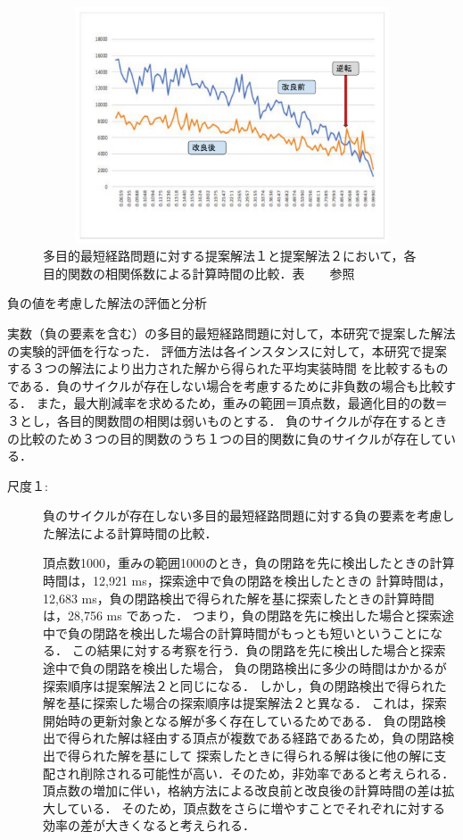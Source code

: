 \documentclass[12pt]{optlab-bachelor}
\begin{document}
\begin{figure}[htbp]
  \centering
  \includegraphics[height=7.0cm , width=15.0cm]{fig/fig18.pdf}
  \caption{多目的最短経路問題に対する提案解法１と提案解法２において，各目的関数の相関係数による計算時間の比較．表　　参照}
\end{figure}


\begin{description}
  \item[負の値を考慮した解法の評価と分析]
\end{description}

実数（負の要素を含む）の多目的最短経路問題に対して，本研究で提案した解法の実験的評価を行なった．
評価方法は各インスタンスに対して，本研究で提案する３つの解法により出力された解から得られた平均実装時間
を比較するものである．負のサイクルが存在しない場合を考慮するために非負数の場合も比較する．
また，最大削減率を求めるため，重みの範囲＝頂点数，最適化目的の数＝３とし，各目的関数間の相関は弱いものとする．
負のサイクルが存在するときの比較のため３つの目的関数のうち１つの目的関数に負のサイクルが存在している．

\begin{description}
  \item[尺度１:]
  負のサイクルが存在しない多目的最短経路問題に対する負の要素を考慮した解法による計算時間の比較．

  頂点数1000，重みの範囲1000のとき，負の閉路を先に検出したときの計算時間は，12,921 ms，探索途中で負の閉路を検出したときの
  計算時間は，12,683 ms，負の閉路検出で得られた解を基に探索したときの計算時間は，28,756 ms であった．
  つまり，負の閉路を先に検出した場合と探索途中で負の閉路を検出した場合の計算時間がもっとも短いということになる．
  この結果に対する考察を行う．負の閉路を先に検出した場合と探索途中で負の閉路を検出した場合，
  負の閉路検出に多少の時間はかかるが探索順序は提案解法２と同じになる．
  しかし，負の閉路検出で得られた解を基に探索した場合の探索順序は提案解法２と異なる．
  これは，探索開始時の更新対象となる解が多く存在しているためである．
  負の閉路検出で得られた解は経由する頂点が複数である経路であるため，負の閉路検出で得られた解を基にして
  探索したときに得られる解は後に他の解に支配され削除される可能性が高い．そのため，非効率であると考えられる．
  頂点数の増加に伴い，格納方法による改良前と改良後の計算時間の差は拡大している．
  そのため，頂点数をさらに増やすことでそれぞれに対する効率の差が大きくなると考えられる．

\end{description}
\end{document}
